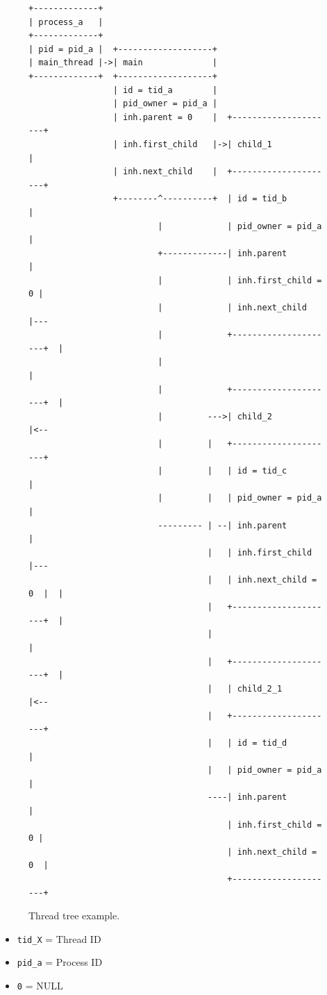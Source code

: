 \begin{figure}
\begin{verbatim}
+-------------+
| process_a   |
+-------------+
| pid = pid_a |  +-------------------+
| main_thread |->| main              |
+-------------+  +-------------------+
                 | id = tid_a        |
                 | pid_owner = pid_a |
                 | inh.parent = 0    |  +---------------------+
                 | inh.first_child   |->| child_1             |
                 | inh.next_child    |  +---------------------+
                 +--------^----------+  | id = tid_b          |
                          |             | pid_owner = pid_a   |
                          +-------------| inh.parent          |
                          |             | inh.first_child = 0 |
                          |             | inh.next_child      |---
                          |             +---------------------+  |
                          |                                      |
                          |             +---------------------+  |
                          |         --->| child_2             |<--
                          |         |   +---------------------+
                          |         |   | id = tid_c          |
                          |         |   | pid_owner = pid_a   |
                          --------- | --| inh.parent          |
                                    |   | inh.first_child     |---
                                    |   | inh.next_child = 0  |  |
                                    |   +---------------------+  |
                                    |                            |
                                    |   +---------------------+  |
                                    |   | child_2_1           |<--
                                    |   +---------------------+
                                    |   | id = tid_d          |
                                    |   | pid_owner = pid_a   |
                                    ----| inh.parent          |
                                        | inh.first_child = 0 |
                                        | inh.next_child = 0  |
                                        +---------------------+
\end{verbatim}
\caption{Thread tree example.}
\label{figure:thtree}
\end{figure}

\begin{itemize}
  \item \verb+tid_X+ = Thread ID
  \item \verb+pid_a+ = Process ID
  \item \verb+0+ = NULL
\end{itemize}

